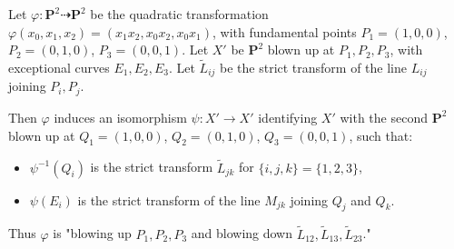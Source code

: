 Let $\varphi: \mathbf{P}^2 \dashrightarrow \mathbf{P}^2$ be the quadratic transformation $\varphi(x_0, x_1, x_2) = (x_1 x_2, x_0 x_2, x_0 x_1)$, with fundamental points $P_1 = (1,0,0)$, $P_2 = (0,1,0)$, $P_3 = (0,0,1)$. Let $X'$ be $\mathbf{P}^2$ blown up at $P_1, P_2, P_3$, with exceptional curves $E_1, E_2, E_3$. Let $\tilde{L}_{ij}$ be the strict transform of the line $L_{ij}$ joining $P_i, P_j$.

Then $\varphi$ induces an isomorphism $\psi: X' \to X'$ identifying $X'$ with the second $\mathbf{P}^2$ blown up at $Q_1 = (1,0,0)$, $Q_2 = (0,1,0)$, $Q_3 = (0,0,1)$, such that:
\begin{itemize}
\item $\psi^{-1}(Q_i)$ is the strict transform $\tilde{L}_{jk}$ for $\{i,j,k\} = \{1,2,3\}$,
\item $\psi(E_i)$ is the strict transform of the line $M_{jk}$ joining $Q_j$ and $Q_k$.
\end{itemize}
Thus $\varphi$ is "blowing up $P_1, P_2, P_3$ and blowing down $\tilde{L}_{12}, \tilde{L}_{13}, \tilde{L}_{23}$."
